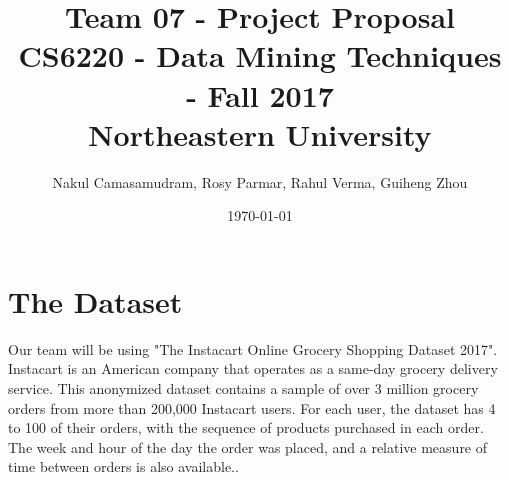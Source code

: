 \documentclass[12pt]{article}
\begin{document}

\title{Team 07 - Project Proposal \\
	   \large CS6220 - Data Mining Techniques - Fall 2017 \\
	   \large Northeastern University}
\author{Nakul Camasamudram, Rosy Parmar, Rahul Verma, Guiheng Zhou}
\date{\today}



\maketitle


\section{The Dataset}


Our team will be using "The Instacart Online Grocery Shopping Dataset 2017". Instacart is an American company that operates as a same-day grocery delivery service.\cite{instacartwiki} This anonymized dataset contains a sample of over 3 million grocery orders from more than 200,000 Instacart users. For each user, the dataset has 4 to 100 of their orders, with the sequence of products purchased in each order. The week and hour of the day the order was placed, and a relative measure of time between orders is also available.\cite{instacartblogpost2017}.
\end{document}
